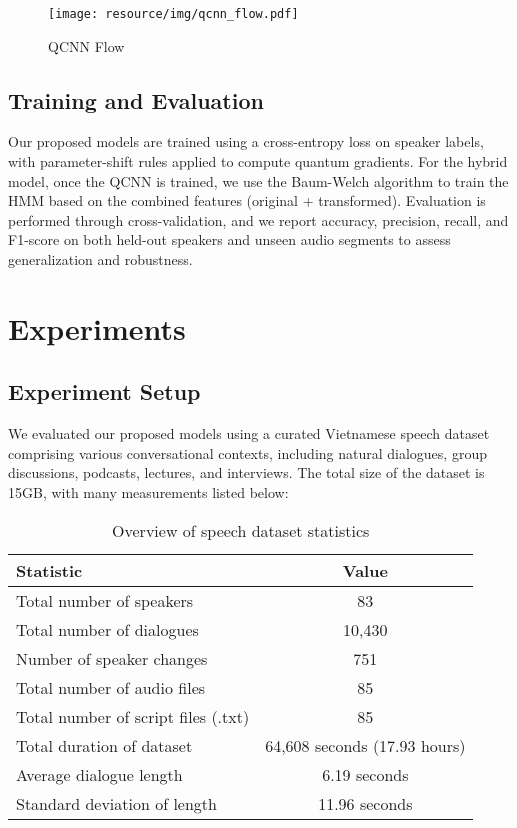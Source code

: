 \documentclass[conference]{IEEEtran}
\begin{document}
\begin{figure}[H]
    \centering
    \begin{minipage}{0.5\textwidth}
        \centering
        \texttt{[image: resource/img/qcnn\_flow.pdf]}
        \caption{QCNN Flow}
        \label{fig:qcnn_flow}
    \end{minipage}

\end{figure}
\subsection{Training and Evaluation}

Our proposed models are trained using a cross-entropy loss on speaker labels, with parameter-shift rules applied to compute quantum gradients. For the hybrid model, once the QCNN is trained, we use the Baum-Welch algorithm to train the HMM based on the combined features (original + transformed). Evaluation is performed through cross-validation, and we report accuracy, precision, recall, and F1-score on both held-out speakers and unseen audio segments to assess generalization and robustness.


\section{Experiments}
\subsection{Experiment Setup}
We evaluated our proposed models using a curated Vietnamese speech dataset comprising various conversational contexts, including natural dialogues, group discussions, podcasts, lectures, and interviews.
The total size of the dataset is 15GB, with many measurements listed below:
\begin{table}[h]
    \centering
    \caption{Overview of speech dataset statistics}
    \begin{tabular}{|l|c|}
        \hline
        \textbf{Statistic}                  & \textbf{Value}               \\
        \hline
        Total number of speakers            & 83                           \\
        Total number of dialogues           & 10,430                       \\
        Number of speaker changes           & 751                          \\
        Total number of audio files         & 85                           \\
        Total number of script files (.txt) & 85                           \\
        Total duration of dataset           & 64,608 seconds (17.93 hours) \\
        Average dialogue length             & 6.19 seconds                 \\
        Standard deviation of length        & 11.96 seconds                \\
        \hline
    \end{tabular}
\end{table}
\end{document}
